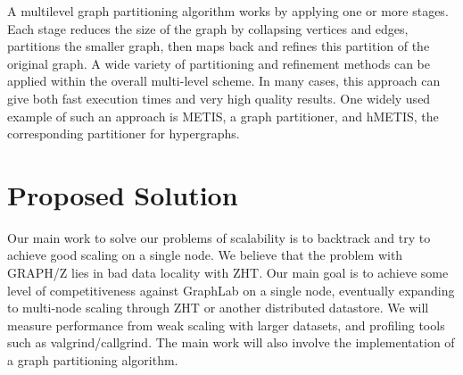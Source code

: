 \documentclass[10pt]{article}
\begin{document}
\begin{multicols}{2}
  A multilevel graph partitioning algorithm works by applying one or more stages. Each stage reduces the size of the graph by collapsing vertices and edges, partitions the smaller graph, then maps back and refines this partition of the original graph. A wide variety of partitioning and refinement methods can be applied within the overall multi-level scheme. In many cases, this approach can give both fast execution times and very high quality results. One widely used example of such an approach is METIS, a graph partitioner, and hMETIS, the corresponding partitioner for hypergraphs.
  
  \section{Proposed Solution}
  Our main work to solve our problems of scalability is to backtrack and try to achieve good scaling on a single node. We believe that the problem with GRAPH/Z lies in bad data locality with ZHT. Our main goal is to achieve some level of competitiveness against GraphLab on a single node, eventually expanding to multi-node scaling through ZHT or another distributed datastore. We will measure performance from weak scaling with larger datasets, and profiling tools such as valgrind/callgrind. The main work will also involve the implementation of a graph partitioning algorithm.
  

\end{multicols}
\end{document}
